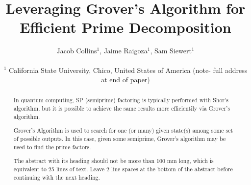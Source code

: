 \documentclass[twocolumn]{cinc}
\begin{document}


\title{Leveraging Grover's Algorithm for Efficient Prime Decomposition}


\author {Jacob Collins$^{1}$, Jaime Raigoza$^{1}$, Sam Siewert$^{1}$ \\
\ \\ %
 $^1$ California State University, Chico, United States of America (note- full address at end of paper)}

\maketitle

\begin{abstract}

  In quantum computing, SP (semiprime) factoring is typically performed 
  with Shor's algorithm, but it is possible to achieve the same results
  more efficientily via Grover's algorithm\cite{whitlock2023quantumfactoringalgorithmusing}. 

  Grover's Algorithm is used to search for one (or many) given state(s)
  among some set of possible outputs. In this case, given some semiprime,
  Grover's algorithm may be used to find the prime factors.

  The abstract with its heading should not be more than 100 mm long,
  which is equivalent to 25 lines of text. Leave 2 line spaces at the
  bottom of the abstract before continuing with the next heading.


\end{abstract}
\end{document}
